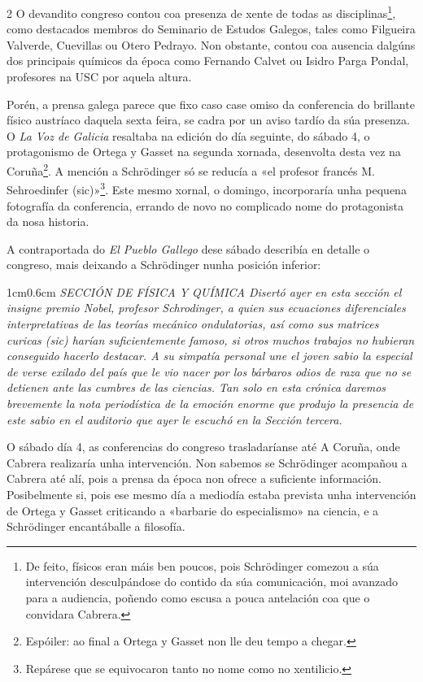 \begin{multicols}{2}
O devandito congreso contou coa presenza
de xente de todas as disciplinas\footnote{De feito, físicos eran máis ben
poucos, pois Schrödinger comezou a súa intervención desculpándose do contido da
súa comunicación, moi avanzado para a audiencia, poñendo como escusa a pouca
antelación coa que o convidara Cabrera.}, como destacados membros do Seminario
de Estudos Galegos, tales como Filgueira Valverde, Cuevillas ou Otero Pedrayo.
Non obstante, contou coa ausencia dalgúns dos principais químicos da época como
Fernando Calvet ou Isidro Parga Pondal, profesores na USC por aquela altura.

Porén, a prensa galega parece que fixo caso case omiso da conferencia do
brillante físico austríaco daquela sexta feira, se cadra por un aviso tardío da
súa presenza. O \textit{La Voz de Galicia} resaltaba na edición do día
seguinte, do sábado 4, o protagonismo de Ortega y Gasset na segunda xornada,
desenvolta desta vez na Coruña\footnote{Espóiler: ao final a Ortega y Gasset non
lle deu tempo a chegar.}. A mención a Schrödinger só se reducía a «el profesor
francés M. Sehroedinfer (sic)»\footnote{Repárese que se equivocaron tanto no
nome como no xentilicio.}. Este mesmo xornal, o domingo, incorporaría unha
pequena fotografía da conferencia, errando de novo no complicado nome do
protagonista da nosa historia.

A contraportada do \textit{El Pueblo Gallego} dese sábado describía en detalle
o congreso, mais deixando a Schrödinger nunha posición inferior:

\begin{adjustwidth}{1cm}{0.6cm}
    \textit{SECCIÓN DE FÍSICA Y QUÍMICA Disertó ayer en esta sección el insigne premio
    Nobel, profesor Schrodinger, a quien sus ecuaciones diferenciales
    interpretativas de las teorías mecánico ondulatorias, así como sus matrices
    curicas (sic) harían suficientemente famoso, si otros muchos trabajos no
    hubieran conseguido hacerlo destacar. A su simpatía personal une el joven
    sabio la especial de verse exilado del país que le vio nacer por los
    bárbaros odios de raza que no se detienen ante las cumbres de las ciencias.
    Tan solo en esta crónica daremos brevemente la nota periodística de la
    emoción enorme que produjo la presencia de este sabio en el auditorio que
    ayer le escuchó en la Sección tercera.}
\end{adjustwidth}

O sábado día 4, as conferencias do congreso trasladaríanse até A Coruña, onde
Cabrera realizaría unha intervención. Non sabemos se Schrödinger acompañou a
Cabrera até alí, pois a prensa da época non ofrece a suficiente información.
Posibelmente si, pois ese mesmo día a mediodía estaba prevista unha
intervención de Ortega y Gasset criticando a «barbarie do especialismo» na
ciencia, e a Schrödinger encantáballe a filosofía.


\end{multicols}
